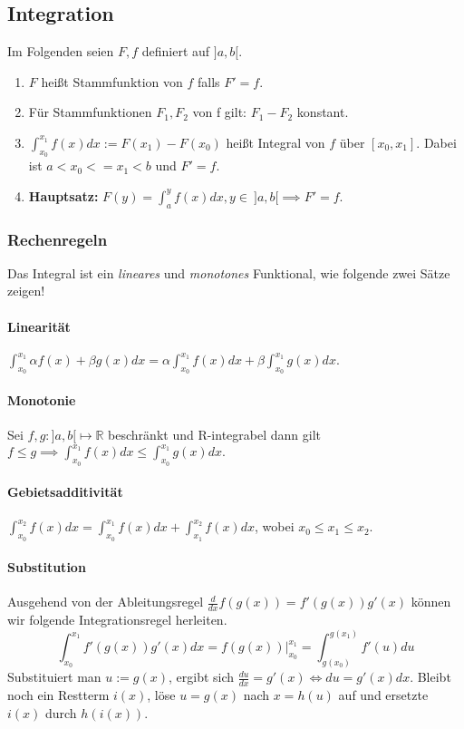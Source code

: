 \documentclass[a4paper, 9pt, DIV=24]{scrartcl}
\begin{document}
\subsection{Integration}
Im Folgenden seien $F, f$ definiert auf $]a,b[$.
\begin{enumerate}[label={(}\arabic*{)}]
 \item $F$ heißt Stammfunktion von $f$ falls $F' = f$.
 \item Für Stammfunktionen $F_1, F_2$ von f gilt: $F_1 - F_2$ konstant.
 \item $\int_{x_0}^{x_1}f(x)dx := F(x_1) - F(x_0)$ heißt Integral von $f$ über $[x_0, x_1]$.
   Dabei ist $a < x_0 <= x_1 < b$ und $F' = f$.
 \item \textbf{Hauptsatz:} $F(y) = \int_{a}^{y}f(x)dx, y \in\ ]a,b[ \implies F' = f.$
\end{enumerate}
\subsubsection{Rechenregeln}
Das Integral ist ein \emph{lineares} und \emph{monotones} Funktional, wie folgende zwei Sätze zeigen!
\paragraph{Linearität}
$\int_{x_0}^{x_1}\alpha f(x) + \beta g(x) dx = \alpha\int_{x_0}^{x_1}f(x)dx + \beta\int_{x_0}^{x_1}g(x)dx.$
\paragraph{Monotonie}
Sei $f,g : ]a,b[ \mapsto \mathbb{R}$ beschränkt und R-integrabel dann gilt
$ f \leq g \implies \int_{x_0}^{x_1}f(x)dx \leq \int_{x_0}^{x_1}g(x)dx. $
\paragraph{Gebietsadditivität}
$\int_{x_0}^{x_2}f(x)dx = \int_{x_0}^{x_1}f(x)dx + \int_{x_1}^{x_2}f(x)dx$, wobei $x_0 \leq x_1 \leq x_2$.

\paragraph{Substitution}
Ausgehend von der Ableitungsregel $\frac{d}{dx}f(g(x)) = f'(g(x))g'(x)$ können wir folgende Integrationsregel herleiten.
\[ \int_{x_0}^{x_1}f'(g(x))g'(x)dx = f(g(x))|_{x_0}^{x_1} = \int_{g(x_0)}^{g(x_1)}f'(u)du \]
Substituiert man $u := g(x)$, ergibt sich $\frac{du}{dx} = g'(x) \iff du = g'(x)dx$.
Bleibt noch ein Restterm $i(x)$, löse $u = g(x)$ nach $x = h(u)$ auf und ersetzte $i(x)$ durch $h(i(x))$.
\end{document}

